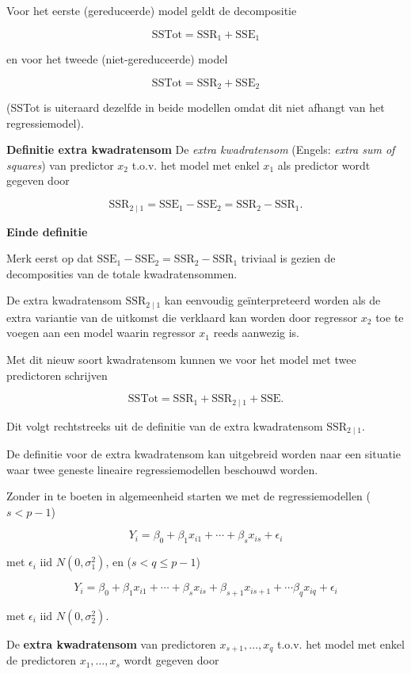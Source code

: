 \documentclass[
  dutch,
  letterpaper,
  12pt]{book}
\theoremstyle{definition}
\theoremstyle{definition}
\theoremstyle{definition}
\theoremstyle{remark}
\begin{document}
Voor het eerste (gereduceerde) model geldt de decompositie

\[
  \text{SSTot} = \text{SSR}_1 + \text{SSE}_1
\]

en voor het tweede (niet-gereduceerde) model

\[
  \text{SSTot} = \text{SSR}_2 + \text{SSE}_2
\]

(SSTot is uiteraard dezelfde in beide modellen omdat dit niet afhangt
van het regressiemodel).

\textbf{Definitie extra kwadratensom} De \emph{extra kwadratensom}
(Engels: \emph{extra sum of squares}) van predictor \(x_2\) t.o.v. het
model met enkel \(x_1\) als predictor wordt gegeven door

\[
  \text{SSR}_{2\mid 1} = \text{SSE}_1-\text{SSE}_2=\text{SSR}_2-\text{SSR}_1.
\]

\textbf{Einde definitie}

Merk eerst op dat
\(\text{SSE}_1-\text{SSE}_2=\text{SSR}_2-\text{SSR}_1\) triviaal is
gezien de decomposities van de totale kwadratensommen.

De extra kwadratensom \(\text{SSR}_{2\mid 1}\) kan eenvoudig
geïnterpreteerd worden als de extra variantie van de uitkomst die
verklaard kan worden door regressor \(x_2\) toe te voegen aan een model
waarin regressor \(x_1\) reeds aanwezig is.

Met dit nieuw soort kwadratensom kunnen we voor het model met twee
predictoren schrijven

\[
  \text{SSTot} = \text{SSR}_1+ \text{SSR}_{2\mid 1} + \text{SSE}.
\]

Dit volgt rechtstreeks uit de definitie van de extra kwadratensom
\(\text{SSR}_{2\mid 1}\).

De definitie voor de extra kwadratensom kan uitgebreid worden naar een
situatie waar twee geneste lineaire regressiemodellen beschouwd worden.

Zonder in te boeten in algemeenheid starten we met de regressiemodellen
(\(s<p-1\))

\[
Y_i = \beta_0 + \beta_1 x_{i1} + \cdots + \beta_{s} x_{is} + \epsilon_i
\]

met \(\epsilon_i\text{ iid }N(0,\sigma_1^{2})\), en (\(s< q\leq p-1\))

\[
Y_i = \beta_0 + \beta_1 x_{i1} + \cdots + \beta_{s} x_{is} + \beta_{s+1} x_{is+1} + \cdots \beta_{q}x_{iq}+ \epsilon_i
\]

met \(\epsilon_i\text{ iid } N(0,\sigma_2^{2})\).

De \textbf{extra kwadratensom} van predictoren \(x_{s+1}, \ldots, x_q\)
t.o.v. het model met enkel de predictoren \(x_1,\ldots, x_{s}\) wordt
gegeven door
\end{document}
